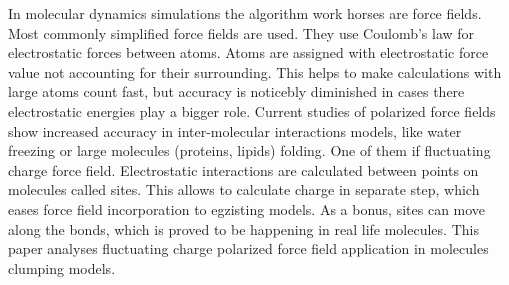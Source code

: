 In molecular dynamics simulations the algorithm work horses are force fields.
Most commonly simplified force fields are used.
They use Coulomb's law for electrostatic forces between atoms.
Atoms are assigned with electrostatic force value not accounting for their surrounding.
This helps to make calculations with large atoms count fast, but accuracy is noticebly diminished in cases there electrostatic energies play a bigger role.
Current studies of polarized force fields show increased accuracy in inter-molecular interactions models,
like water freezing or large molecules (proteins, lipids) folding.
One of them if fluctuating charge force field.
Electrostatic interactions are calculated between points on molecules called sites.
This allows to calculate charge in separate step, which eases force field incorporation to egzisting models.
As a bonus, sites can move along the bonds, which is proved to be happening in real life molecules.
This paper analyses fluctuating charge polarized force field application in molecules clumping models.
